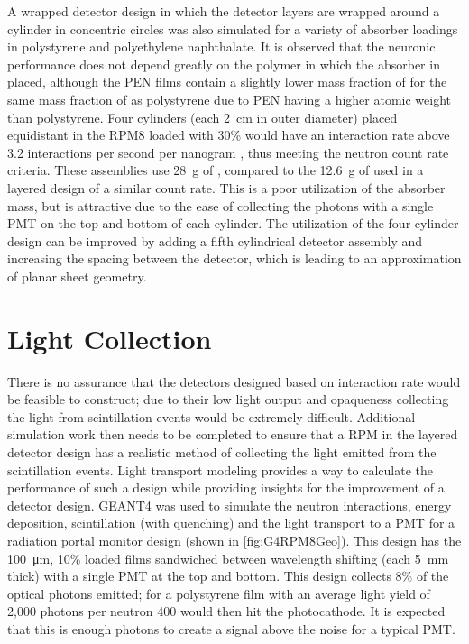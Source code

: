 A wrapped detector design in which the detector layers are wrapped around a cylinder in concentric circles was also simulated for a variety of absorber loadings in polystyrene and polyethylene naphthalate.
It is observed that the neuronic performance does not depend greatly on the polymer in which the absorber in placed, although the PEN films contain a slightly lower mass fraction of  for the same mass fraction of  as polystyrene due to PEN having a higher atomic weight than polystyrene.
Four cylinders (each \SI{2}{\cm} in outer diameter) placed equidistant in the RPM8 loaded with 30\%  would have an interaction rate above 3.2 interactions per second per nanogram , thus meeting the neutron count rate criteria. These assemblies use \SI{28}{\gram} of , compared to the \SI{12.6}{\gram} of  used in a layered design of a similar count rate.
This is a poor utilization of the absorber mass, but is attractive due to the ease of collecting the photons with a single PMT on the top and bottom of each cylinder.
The  utilization of the four cylinder design can be improved by adding a fifth cylindrical detector assembly and increasing the spacing between the detector, which is leading to an approximation of planar sheet geometry.


\section{Light Collection}
There is no assurance that the detectors designed based on interaction rate would be feasible to construct; due to their low light output and opaqueness collecting the light from scintillation events would be extremely difficult.  
Additional simulation work then needs to be completed to ensure that a RPM in the layered detector design has a realistic method of collecting the light emitted from the scintillation events.
Light transport modeling provides a way to calculate the performance of such a design while providing insights for the improvement of a detector design.
GEANT4 was used to simulate the neutron interactions, energy deposition, scintillation (with quenching) and the light transport to a PMT for a radiation portal monitor design (shown in \autoref{fig:G4RPM8Geo}).
This design has the \SI{100}{\um}, 10\% loaded  films sandwiched between wavelength shifting (each \SI{5}{\mm} thick) with a single PMT at the top and bottom.
This design collects 8\% of the optical photons emitted; for a polystyrene film with an average light yield of 2,000 photons per neutron 400 would then hit the photocathode.
It is expected that this is enough photons to create a signal above the noise for a typical PMT.
